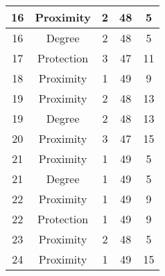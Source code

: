 \documentclass[results.tex]{subfiles}
\begin{document}
\begin{center}
\begin{tabular}{| c || c | c | c | c |}
            \hline
            16                      & Proximity                    & 2                      & 48                      & 5                    \\
            \hline
            16                      & Degree                       & 2                      & 48                      & 5                    \\
            \hline
            17                      & Protection                   & 3                      & 47                      & 11                   \\
            \hline
            18                      & Proximity                    & 1                      & 49                      & 9                    \\
            \hline
            19                      & Proximity                    & 2                      & 48                      & 13                   \\
            \hline
            19                      & Degree                       & 2                      & 48                      & 13                   \\
            \hline
            20                      & Proximity                    & 3                      & 47                      & 15                   \\
            \hline
            21                      & Proximity                    & 1                      & 49                      & 5                    \\
            \hline
            21                      & Degree                       & 1                      & 49                      & 5                    \\
            \hline
            22                      & Proximity                    & 1                      & 49                      & 9                    \\
            \hline
            22                      & Protection                   & 1                      & 49                      & 9                    \\
            \hline
            23                      & Proximity                    & 2                      & 48                      & 5                    \\
            \hline
            24                      & Proximity                    & 1                      & 49                      & 15                   \\

\end{tabular}
\end{center}
\end{document}
